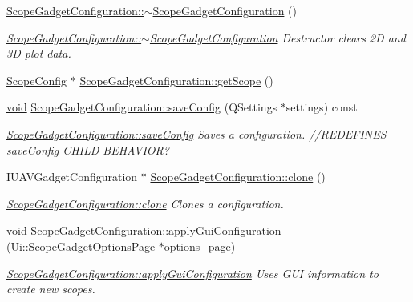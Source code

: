\begin{DoxyCompactItemize}
\hyperlink{group___scope_plugin_ga3a4bf5369afe5c90183e5de5b9a64c99}{\-Scope\-Gadget\-Configuration\-::$\sim$\-Scope\-Gadget\-Configuration} ()
\begin{DoxyCompactList}\small\item\em \hyperlink{group___scope_plugin_ga3a4bf5369afe5c90183e5de5b9a64c99}{\-Scope\-Gadget\-Configuration\-::$\sim$\-Scope\-Gadget\-Configuration} \-Destructor clears 2\-D and 3\-D plot data. \end{DoxyCompactList}\item 
\hyperlink{class_scope_config}{\-Scope\-Config} $\ast$ \hyperlink{group___scope_plugin_gad77c6650f45b62d917a93db28ddbcc56}{\-Scope\-Gadget\-Configuration\-::get\-Scope} ()
\item 
\hyperlink{group___u_a_v_objects_plugin_ga444cf2ff3f0ecbe028adce838d373f5c}{void} \hyperlink{group___scope_plugin_ga1019b17dbc40bb39cb4deb12fe85912e}{\-Scope\-Gadget\-Configuration\-::save\-Config} (\-Q\-Settings $\ast$settings) const 
\begin{DoxyCompactList}\small\item\em \hyperlink{group___scope_plugin_ga1019b17dbc40bb39cb4deb12fe85912e}{\-Scope\-Gadget\-Configuration\-::save\-Config} \-Saves a configuration. //\-R\-E\-D\-E\-F\-I\-N\-E\-S save\-Config \-C\-H\-I\-L\-D \-B\-E\-H\-A\-V\-I\-O\-R? \end{DoxyCompactList}\item 
\-I\-U\-A\-V\-Gadget\-Configuration $\ast$ \hyperlink{group___scope_plugin_ga85df073ffa0cd27035a937df7c2cff8e}{\-Scope\-Gadget\-Configuration\-::clone} ()
\begin{DoxyCompactList}\small\item\em \hyperlink{group___scope_plugin_ga85df073ffa0cd27035a937df7c2cff8e}{\-Scope\-Gadget\-Configuration\-::clone} \-Clones a configuration. \end{DoxyCompactList}\item 
\hyperlink{group___u_a_v_objects_plugin_ga444cf2ff3f0ecbe028adce838d373f5c}{void} \hyperlink{group___scope_plugin_gaa68457b9b187faa4190e2f5d1343cbbb}{\-Scope\-Gadget\-Configuration\-::apply\-Gui\-Configuration} (\-Ui\-::\-Scope\-Gadget\-Options\-Page $\ast$options\-\_\-page)
\begin{DoxyCompactList}\small\item\em \hyperlink{group___scope_plugin_gaa68457b9b187faa4190e2f5d1343cbbb}{\-Scope\-Gadget\-Configuration\-::apply\-Gui\-Configuration} \-Uses \-G\-U\-I information to create new scopes. \end{DoxyCompactList}\item 

\end{DoxyCompactItemize}
